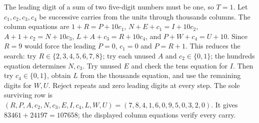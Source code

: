 The leading digit of a sum of two five-digit numbers must be one, so $T=1$. Let $c_1,c_2,c_3,c_4$ be successive carries from the units through thousands columns. The column equations are $1+R=P+10c_1$, $N+E+c_1=I+10c_2$, $A+1+c_2=N+10c_3$, $L+A+c_3=R+10c_4$, and $P+W+c_4=U+10$. Since $R=9$ would force the leading $P=0$, $c_1=0$ and $P=R+1$. This reduces the search: try $R\in\{2,3,4,5,6,7,8\}$; try each unused $A$ and $c_2\in\{0,1\}$; the hundreds equation determines $N,c_3$. Try unused $E$ and check the tens equation for $I$. Then try $c_4\in\{0,1\}$, obtain $L$ from the thousands equation, and use the remaining digits for $W,U$. Reject repeats and zero leading digits at every step. The sole surviving row is $(R,P,A,c_2,N,c_3,E,I,c_4,L,W,U)=(7,8,4,1,6,0,9,5,0,3,2,0)$. It gives $\boxed{83461+24197=107658}$; the displayed column equations verify every carry.
